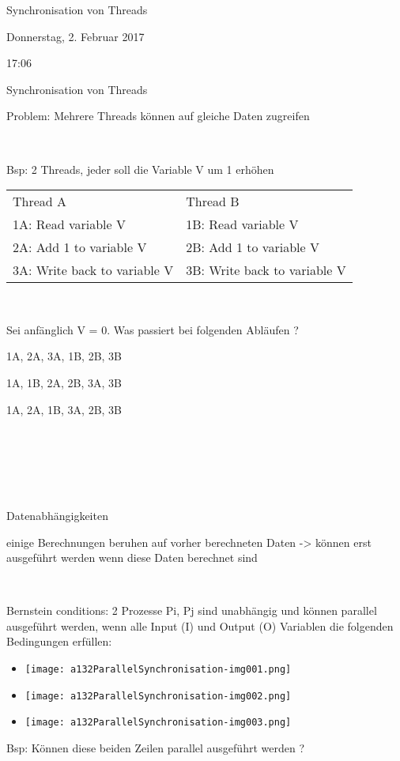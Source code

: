 Synchronisation von Threads

Donnerstag, 2. Februar 2017

17:06

Synchronisation von Threads

Problem: Mehrere Threads können auf gleiche Daten zugreifen

~

Bsp: 2 Threads, jeder soll die Variable V um 1 erhöhen

\begin{flushleft}
\tablefirsthead{}
\tablehead{}
\tabletail{}
\tablelasttail{}
\begin{supertabular}{m{6.736cm}m{5.762cm}}
Thread A &
Thread B\\
1A: Read variable V &
1B: Read variable V\\
2A: Add 1 to variable V &
2B: Add 1 to variable V\\
3A: Write back to variable V &
3B: Write back to variable V\\
\end{supertabular}
\end{flushleft}
~

Sei anfänglich V = 0. Was passiert bei folgenden Abläufen ? 

1A, 2A, 3A, 1B, 2B, 3B

1A, 1B, 2A, 2B, 3A, 3B

1A, 2A, 1B, 3A, 2B, 3B

~

~

~

Datenabhängigkeiten

einige Berechnungen beruhen auf vorher berechneten Daten -{\textgreater} können erst ausgeführt werden wenn diese Daten berechnet sind

~

Bernstein conditions: 2 Prozesse Pi, Pj sind unabhängig und können parallel ausgeführt werden, wenn alle Input (I) und Output (O) Variablen die folgenden Bedingungen erfüllen:

\begin{itemize}
\item  \texttt{[image: a132ParallelSynchronisation-img001.png]} 
\item  \texttt{[image: a132ParallelSynchronisation-img002.png]} 
\item  \texttt{[image: a132ParallelSynchronisation-img003.png]} 
\end{itemize}
Bsp: Können diese beiden Zeilen parallel ausgeführt werden ? 

